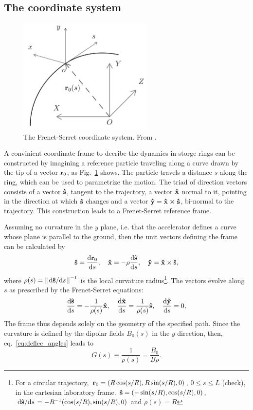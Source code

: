 \subsection{The coordinate system}
\begin{figure}[htb]
    \centering
    \includegraphics[width=0.6\textwidth]{Images/frenetserret.png}
    \caption{The Frenet-Serret coordinate system. From \cite{huang2019beam}.}
    \label{fig:frenet-serret}
\end{figure}
A convinient coordinate frame to decribe the dynamics in storge rings can be constructed by imagining a reference particle traveling along a curve drawn by the tip of a vector $\vb{r}_0$, as Fig.~\ref{fig:frenet-serret} shows. The particle travels a distance $s$ along the ring, which can be used to parametrize the motion. The triad of direction vectors consists of a vector $\vu{s}$, tangent to the trajectory, a vector $\vu{x}$ normal to it, pointing in the direction at which $\vu{s}$ changes and a vector $\vu{y}=\vu{x}\cross\vu{s}$, bi-normal to the trajectory. This construction leads to a Frenet-Serret reference frame.

Assuming no curvature in the $y$ plane, i.e. that the accelerator defines a curve whose plane is parallel to the ground, then the unit vectors defining the frame can be calculated by\cite{lee}
\begin{equation}
\vu{s}=\dv{\vb{r}_{0}}{s}, \quad \vu{x}=-\rho\dv{\vu{s}}{s}, \quad \vu{y} =  \vu{x}\times\vu{s},
\end{equation}
where $\rho(s) = \norm{\dv*{\vu{s}}{s}}^{-1}$ is the local curvature radius\footnote{For a circular trajectory, $\vb{r}_0 = (R\cos(s/R), R\sin(s/R), 0)$, $ 0\leq s \leq L$ (check), in the cartesian laboratory frame. $\vu{s}=(-\sin(s/R), \cos(s/R), 0)$, $\dv*{\vu{s}}{s} = -R^{-1}(\cos(s/R),\sin(s/R), 0 )$ and $\rho(s)=R$}. The vectors evolve along $s$ as prescribed by the Frenet-Serret equations:
\begin{equation}
\dv{\vu{s}}{s}=-\frac{1}{\rho(s)}\vu{x}, \quad\dv{\vu{x}}{s}=\frac{1}{\rho(s)}\vu{s}, \quad \dv{\vu{y}}{s}=0,
\end{equation}
The frame thus depends solely on the geometry of the specified path. Since the curvature is defined by the dipolar fields $B_0(s)$ in the $y$ direction, then, eq.~\eqref{eq:deflec_angles} leads to
    \begin{equation}
        G(s) \equiv \frac{1}{\rho(s)} = \frac{B_0}{B\rho}.
        \label{G}
    \end{equation}

